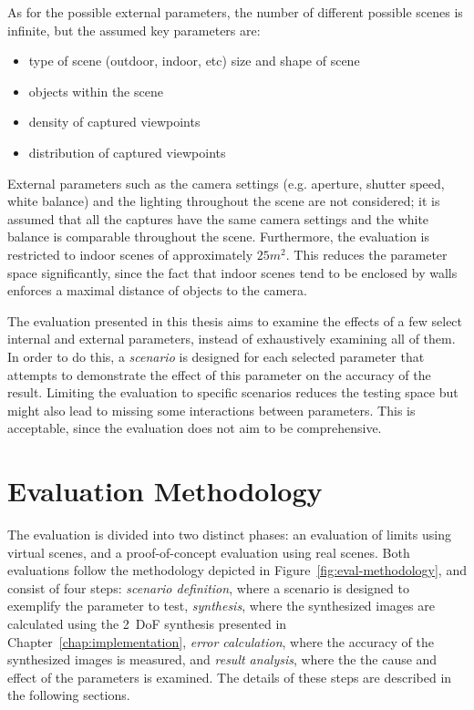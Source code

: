 As for the possible external parameters, the number of different possible scenes is infinite, but the assumed key parameters are:
\begin{itemize}
  \item type of scene (outdoor, indoor, etc) \ar size and shape of scene
  \item objects within the scene
  \item density of captured viewpoints
  \item distribution of captured viewpoints
\end{itemize}

External parameters such as the camera settings (e.g. aperture, shutter speed, white balance) and the lighting throughout the scene are not considered; it is assumed that all the captures have the same camera settings and the white balance is comparable throughout the scene. Furthermore, the evaluation is restricted to indoor scenes of approximately $25m^2$. This reduces the parameter space significantly, since the fact that indoor scenes tend to be enclosed by walls enforces a maximal distance of objects to the camera.

The evaluation presented in this thesis aims to examine the effects of a few select internal and external parameters, instead of exhaustively examining all of them. In order to do this, a \emph{scenario} is designed for each selected parameter that attempts to demonstrate the effect of this parameter on the accuracy of the result. Limiting the evaluation to specific scenarios reduces the testing space but might also lead to missing some interactions between parameters. This is acceptable, since the evaluation does not aim to be comprehensive. 


\section{Evaluation Methodology} \label{sec:eval_methodology}
The evaluation is divided into two distinct phases: an evaluation of limits using virtual scenes, and a proof-of-concept evaluation using real scenes. Both evaluations follow the methodology depicted in Figure~\ref{fig:eval-methodology}, and consist of four steps: \emph{scenario definition}, where a scenario is designed to exemplify the parameter to test, \emph{synthesis}, where the synthesized images are calculated using the 2~DoF synthesis presented in Chapter~\ref{chap:implementation}, \emph{error calculation}, where the accuracy of the synthesized images is measured, and \emph{result analysis}, where the the cause and effect of the parameters is examined. The details of these steps are described in the following sections.

